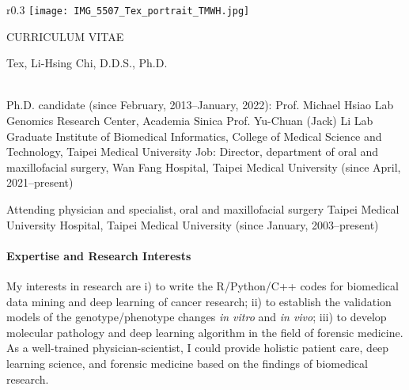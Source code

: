 
\begin{vita}

\begin{wrapfigure}{r}{0.3\textwidth}
    \centering
    \texttt{[image: IMG\_5507\_Tex\_portrait\_TMWH.jpg]}
\end{wrapfigure}

CURRICULUM VITAE

Tex, Li-Hsing Chi, D.D.S., Ph.D.\\
\\

\begin{outline}

\0 Ph.D. candidate (since February, 2013--January, 2022):
\1 Prof. Michael Hsiao Lab\\
Genomics Research Center, Academia Sinica
\1 Prof. Yu-Chuan (Jack) Li Lab\\
Graduate Institute of Biomedical Informatics, College of Medical Science and Technology, Taipei Medical University
\0 Job: %
\1 Director, department of oral and maxillofacial surgery,
Wan Fang Hospital, Taipei Medical University (since April, 2021--present)

\1 Attending physician and specialist, oral and maxillofacial surgery
Taipei Medical University Hospital, Taipei Medical University (since January, 2003--present)

\end{outline}



\paragraph*{Expertise and Research Interests}

My interests in research are i) to write the R/Python/C++ codes for biomedical data mining and deep learning of cancer research; ii) to establish the validation models of the genotype/phenotype changes \textit{\selectfont in vitro} and \textit{\selectfont in vivo}; iii) to develop molecular pathology and deep learning algorithm in the field of forensic medicine. 
As a well-trained physician-scientist, I could provide holistic patient care, deep learning science, and forensic medicine based on the findings of biomedical research.



\end{vita}
